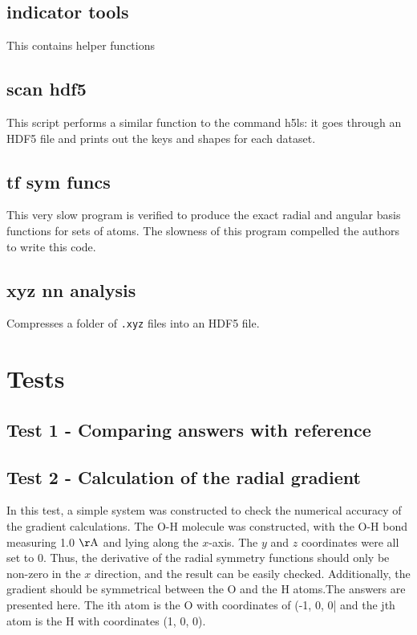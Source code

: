 \documentclass{article}
\begin{document}
\subsection{indicator tools}
This contains helper functions

\subsection{scan hdf5}
This script performs a similar function to the command h5ls: it goes through an HDF5 file and prints out the keys and shapes for each dataset.

\subsection{tf sym funcs}
This very slow program is verified to produce the exact radial and angular basis functions for sets of atoms.
The slowness of this program compelled the authors to write this code.

\subsection{xyz nn analysis}
Compresses a folder of \texttt{.xyz} files into an HDF5 file.


\section{Tests}
\subsection{Test 1 - Comparing answers with reference}

\subsection{Test 2 - Calculation of the radial gradient}
In this test, a simple system was constructed to check the numerical accuracy of the gradient calculations. The O-H molecule was constructed, with the O-H bond measuring 1.0 $\mathrm{\AA}$ and lying along the $x$-axis. The $y$ and $z$ coordinates were all set to 0. Thus, the derivative of the radial symmetry functions should only be non-zero in the $x$ direction, and the result can be easily checked. Additionally, the gradient should be symmetrical between the O and the H atoms.The answers are presented here. The ith atom is the O with coordinates of (-1, 0, 0| and the jth atom is the H with coordinates (1, 0, 0).
\end{document}
